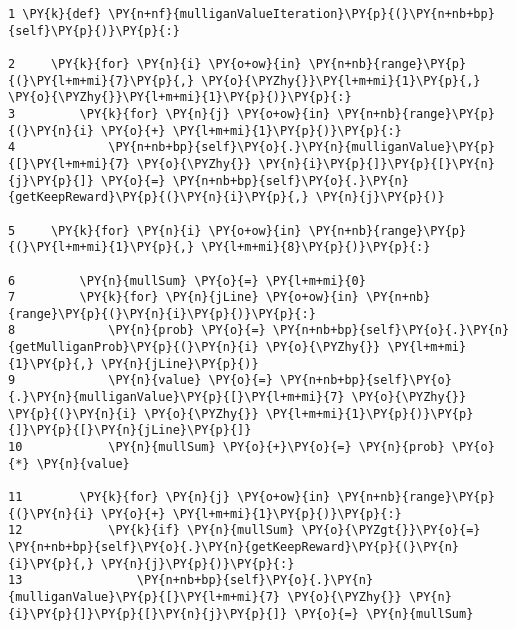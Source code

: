 \begin{Verbatim}[commandchars=\\\{\}]
1 \PY{k}{def} \PY{n+nf}{mulliganValueIteration}\PY{p}{(}\PY{n+nb+bp}{self}\PY{p}{)}\PY{p}{:}

2     \PY{k}{for} \PY{n}{i} \PY{o+ow}{in} \PY{n+nb}{range}\PY{p}{(}\PY{l+m+mi}{7}\PY{p}{,} \PY{o}{\PYZhy{}}\PY{l+m+mi}{1}\PY{p}{,} \PY{o}{\PYZhy{}}\PY{l+m+mi}{1}\PY{p}{)}\PY{p}{:}
3         \PY{k}{for} \PY{n}{j} \PY{o+ow}{in} \PY{n+nb}{range}\PY{p}{(}\PY{n}{i} \PY{o}{+} \PY{l+m+mi}{1}\PY{p}{)}\PY{p}{:}
4             \PY{n+nb+bp}{self}\PY{o}{.}\PY{n}{mulliganValue}\PY{p}{[}\PY{l+m+mi}{7} \PY{o}{\PYZhy{}} \PY{n}{i}\PY{p}{]}\PY{p}{[}\PY{n}{j}\PY{p}{]} \PY{o}{=} \PY{n+nb+bp}{self}\PY{o}{.}\PY{n}{getKeepReward}\PY{p}{(}\PY{n}{i}\PY{p}{,} \PY{n}{j}\PY{p}{)}

5     \PY{k}{for} \PY{n}{i} \PY{o+ow}{in} \PY{n+nb}{range}\PY{p}{(}\PY{l+m+mi}{1}\PY{p}{,} \PY{l+m+mi}{8}\PY{p}{)}\PY{p}{:}

6         \PY{n}{mullSum} \PY{o}{=} \PY{l+m+mi}{0}
7         \PY{k}{for} \PY{n}{jLine} \PY{o+ow}{in} \PY{n+nb}{range}\PY{p}{(}\PY{n}{i}\PY{p}{)}\PY{p}{:}
8             \PY{n}{prob} \PY{o}{=} \PY{n+nb+bp}{self}\PY{o}{.}\PY{n}{getMulliganProb}\PY{p}{(}\PY{n}{i} \PY{o}{\PYZhy{}} \PY{l+m+mi}{1}\PY{p}{,} \PY{n}{jLine}\PY{p}{)}
9             \PY{n}{value} \PY{o}{=} \PY{n+nb+bp}{self}\PY{o}{.}\PY{n}{mulliganValue}\PY{p}{[}\PY{l+m+mi}{7} \PY{o}{\PYZhy{}} \PY{p}{(}\PY{n}{i} \PY{o}{\PYZhy{}} \PY{l+m+mi}{1}\PY{p}{)}\PY{p}{]}\PY{p}{[}\PY{n}{jLine}\PY{p}{]}
10            \PY{n}{mullSum} \PY{o}{+}\PY{o}{=} \PY{n}{prob} \PY{o}{*} \PY{n}{value}

11        \PY{k}{for} \PY{n}{j} \PY{o+ow}{in} \PY{n+nb}{range}\PY{p}{(}\PY{n}{i} \PY{o}{+} \PY{l+m+mi}{1}\PY{p}{)}\PY{p}{:}
12            \PY{k}{if} \PY{n}{mullSum} \PY{o}{\PYZgt{}}\PY{o}{=} \PY{n+nb+bp}{self}\PY{o}{.}\PY{n}{getKeepReward}\PY{p}{(}\PY{n}{i}\PY{p}{,} \PY{n}{j}\PY{p}{)}\PY{p}{:}
13                \PY{n+nb+bp}{self}\PY{o}{.}\PY{n}{mulliganValue}\PY{p}{[}\PY{l+m+mi}{7} \PY{o}{\PYZhy{}} \PY{n}{i}\PY{p}{]}\PY{p}{[}\PY{n}{j}\PY{p}{]} \PY{o}{=} \PY{n}{mullSum}
\end{Verbatim}
